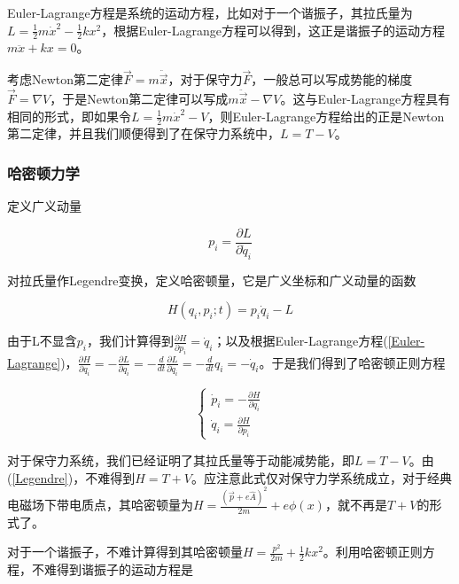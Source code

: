 Euler-Lagrange方程是系统的运动方程，比如对于一个谐振子，其拉氏量为$L=\frac{1}{2}m\dot{x}^2-\frac{1}{2}kx^2$，根据Euler-Lagrange方程可以得到，这正是谐振子的运动方程$m\ddot{x}+kx=0$。

考虑Newton第二定律$\vec{F}=m\ddot{\vec{x}}$，对于保守力$\vec{F}$，一般总可以写成势能的梯度$\vec{F}=\nabla V$，于是Newton第二定律可以写成$m\ddot{\vec{x}}-\nabla V$。这与Euler-Lagrange方程具有相同的形式，即如果令$L=\frac{1}{2}m\dot{x}^2-V$，则Euler-Lagrange方程给出的正是Newton第二定律，并且我们顺便得到了在保守力系统中，$L=T-V$。

\subsubsection{哈密顿力学}

定义广义动量

\begin{equation}\label{Legendre}
    p_i=\frac{\partial L}{\partial \dot{q}_i} 
\end{equation}

对拉氏量作Legendre变换，定义哈密顿量，它是广义坐标和广义动量的函数

\begin{equation}
    H(q_i,p_i;t)=p_i\dot{q}_i-L
\end{equation}

由于L不显含$p_i$，我们计算得到$\frac{\partial H}{\partial p_i}=\dot{q}_i$；以及根据Euler-Lagrange方程(\ref{Euler-Lagrange})，$\frac{\partial H}{\partial q_i}=-\frac{\partial L}{\partial q_i}=-\frac{d}{dt}\frac{\partial L}{\partial \dot{q}_i}=-\frac{d}{dt}q_i=-\dot{q}_i$。于是我们得到了哈密顿正则方程

\begin{equation}\label{Hamilton-eq}
    \left\{
        \begin{array}{lr}
            \dot{p}_i = -\frac{\partial H}{\partial q_i} \\
            \dot{q}_i = \frac{\partial H}{\partial p_i}
        \end{array}
    \right.
\end{equation}

对于保守力系统，我们已经证明了其拉氏量等于动能减势能，即$L=T-V$。由(\ref{Legendre})，不难得到$H=T+V$。应注意此式仅对保守力学系统成立，对于经典电磁场下带电质点，其哈密顿量为$H=\frac{(\vec{p}+e\hat{A})^2}{2m}+e\phi(x)$，就不再是$T+V$的形式了。

对于一个谐振子，不难计算得到其哈密顿量$H=\frac{p^2}{2m}+\frac{1}{2}kx^2$。利用哈密顿正则方程，不难得到谐振子的运动方程是

